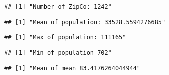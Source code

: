 \documentclass[
]{article}
\newenvironment{Shaded}{\begin{snugshade}}{\end{snugshade}}
\newcommand{\FunctionTok}[1]{\textcolor[rgb]{0.13,0.29,0.53}{\textbf{#1}}}
\newcommand{\NormalTok}[1]{#1}
\newcommand{\SpecialCharTok}[1]{\textcolor[rgb]{0.81,0.36,0.00}{\textbf{#1}}}
\newcommand{\StringTok}[1]{\textcolor[rgb]{0.31,0.60,0.02}{#1}}
\begin{document}
\begin{verbatim}
## [1] "Number of ZipCo: 1242"
\end{verbatim}

\begin{Shaded}
\end{Shaded}

\begin{verbatim}
## [1] "Mean of population: 33528.5594276685"
\end{verbatim}

\begin{Shaded}
\end{Shaded}

\begin{verbatim}
## [1] "Max of population: 111165"
\end{verbatim}

\begin{Shaded}
\end{Shaded}

\begin{verbatim}
## [1] "Min of population 702"
\end{verbatim}

\begin{Shaded}
\end{Shaded}

\begin{verbatim}
## [1] "Mean of mean 83.4176264044944"
\end{verbatim}
\end{document}

